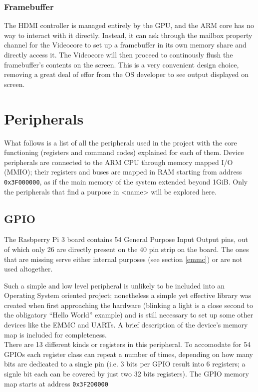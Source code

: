 \documentclass[12pt,a4paper,openright,twoside]{report}
\begin{document}
\subsubsection{Framebuffer}
The HDMI controller is managed entirely by the GPU, and the ARM core has no 
way to interact with it directly. Instead, it can ask through the mailbox
property channel for the Videocore to set up a framebuffer in its own memory
share and directly access it. The Videocore will then proceed to continously flush the
framebuffer's contents on the screen.
This is a very convenient design choice, removing a great deal of effor from
the OS developer to see output displayed on screen.


\section{Peripherals}
What follows is a list of all the peripherals used in the project with the core
functioning (registers and command codes) explained for each of them.
Device peripherals are connected to the ARM CPU through memory mapped I/O (MMIO);
their registers and buses are mapped in RAM starting from address {\tt 0x3F000000},
as if the main memory of the system extended beyond 1GiB.
Only the peripherals that find a purpose in <name> will be explored here.

\subsection{GPIO}
The Rasbperry Pi 3 board contains 54 General Purpose Input Output pins, out of which
only 26 are directly present on the 40 pin strip on the board. The ones that are
missing serve either internal purposes (see section \ref{emmc}) or are not used
altogether.

Such a simple and low level peripheral is unlikely
 to be included into an Operating System oriented project; nonetheless a simple yet effective 
library was created when first approaching the hardware (blinking a light 
is a close second to the obligatory ``Hello World'' example) and is still necessary
to set up some other devices like the EMMC and UARTs.
A brief description of the device's memory map is included for completeness.
\\
There are 13 different kinds or registers in this peripheral. To accomodate for
54 GPIOs each register class can repeat a number of times, depending on how
many bits are dedicated to a single pin (i.e. 3 bits per GPIO result into 6
registers; a signle bit each can be covered by just two 32 bits registers).
The GPIO memory map starts at address {\tt 0x3F200000}
\end{document}
